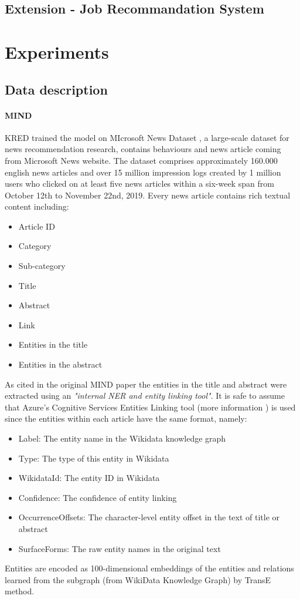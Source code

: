 \documentclass[conference]{IEEEtran}
\begin{document}
\subsection{Extension - Job Recommandation System}


\section{Experiments}
\subsection{Data description}

\paragraph{MIND} \label{Mind-structure}
KRED trained the model on MIcrosoft News Dataset \cite{wu-etal-2020-mind}, a large-scale dataset for news recommendation research, contains behaviours and news article coming from Microsoft News website.
The dataset comprises approximately 160.000 english news articles and over 15 million impression logs created by 1 million users who clicked on at least five news articles within a six-week span from October 12th to November 22nd, 2019.
Every news article contains rich textual content including:
\begin{itemize}
    \item Article ID
    \item Category
    \item Sub-category
    \item Title
    \item Abstract
    \item Link
    \item Entities in the title
    \item Entities in the abstract
\end{itemize}
As cited in the original MIND paper the entities in the title and abstract were extracted using an \textit{"internal NER and entity linking tool"}. It is safe to assume that Azure's Cognitive Services Entities Linking tool (more information \cite{MicrosoftTextAnalyticsAPI}) is used since the entities within each article have the same format, namely:
\begin{itemize}
    \item Label: The entity name in the Wikidata knowledge graph
    \item Type: The type of this entity in Wikidata
    \item WikidataId: The entity ID in Wikidata
    \item Confidence: The confidence of entity linking
    \item OccurrenceOffsets: The character-level entity offset in the text of title or abstract
    \item SurfaceForms: The raw entity names in the original text
\end{itemize}
Entities are encoded as 100-dimensional embeddings of the entities and relations learned from the subgraph (from WikiData Knowledge Graph) by TransE method.
\end{document}

